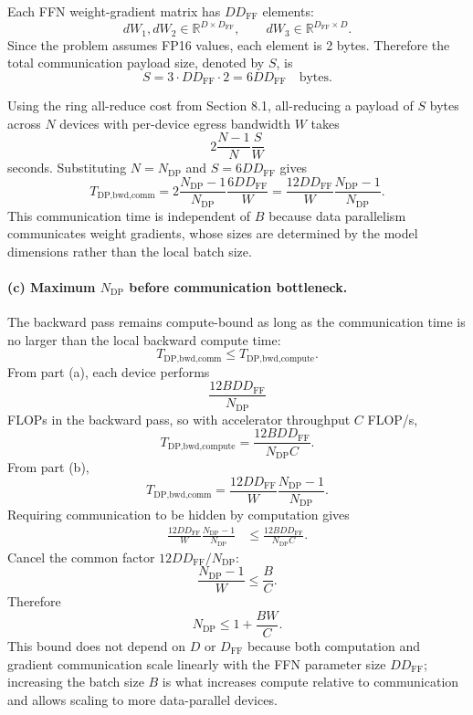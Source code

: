 \documentclass[11pt]{article}
\begin{document}
Each FFN weight-gradient matrix has $D D_{\text{FF}}$ elements:
\[
  dW_1, dW_2 \in \mathbb{R}^{D \times D_{\text{FF}}},
  \qquad
  dW_3 \in \mathbb{R}^{D_{\text{FF}} \times D}.
\]
Since the problem assumes FP16 values, each element is 2 bytes.  Therefore the
total communication payload size, denoted by $S$, is
\[
  S
  =
  3 \cdot D D_{\text{FF}} \cdot 2
  =
  6D D_{\text{FF}}
  \quad\text{bytes}.
\]

Using the ring all-reduce cost from Section 8.1, all-reducing a payload of
$S$ bytes across $N$ devices with per-device egress bandwidth $W$ takes
\[
  2\frac{N-1}{N}\frac{S}{W}
\]
seconds.  Substituting $N=N_{\text{DP}}$ and
$S=6D D_{\text{FF}}$ gives
\[
  \boxed{
  T_{\text{DP,bwd,comm}}
  =
  2\frac{N_{\text{DP}}-1}{N_{\text{DP}}}
  \frac{6D D_{\text{FF}}}{W}
  =
  \frac{12D D_{\text{FF}}}{W}
  \frac{N_{\text{DP}}-1}{N_{\text{DP}}}
  }.
\]
This communication time is independent of $B$ because data parallelism
communicates weight gradients, whose sizes are determined by the model
dimensions rather than the local batch size.


\paragraph{(c) Maximum $N_{\text{DP}}$ before communication bottleneck.}

The backward pass remains compute-bound as long as the communication time is no
larger than the local backward compute time:
\[
  T_{\text{DP,bwd,comm}}
  \le
  T_{\text{DP,bwd,compute}}.
\]
From part (a), each device performs
\[
  \frac{12 B D D_{\text{FF}}}{N_{\text{DP}}}
\]
FLOPs in the backward pass, so with accelerator throughput $C$ FLOP/s,
\[
  T_{\text{DP,bwd,compute}}
  =
  \frac{12 B D D_{\text{FF}}}{N_{\text{DP}} C}.
\]
From part (b),
\[
  T_{\text{DP,bwd,comm}}
  =
  \frac{12D D_{\text{FF}}}{W}
  \frac{N_{\text{DP}}-1}{N_{\text{DP}}}.
\]
Requiring communication to be hidden by computation gives
\begin{align*}
  \frac{12D D_{\text{FF}}}{W}
  \frac{N_{\text{DP}}-1}{N_{\text{DP}}}
  &\le
  \frac{12 B D D_{\text{FF}}}{N_{\text{DP}} C}.
\end{align*}
Cancel the common factor $12D D_{\text{FF}}/N_{\text{DP}}$:
\[
  \frac{N_{\text{DP}}-1}{W}
  \le
  \frac{B}{C}.
\]
Therefore
\[
  \boxed{
    N_{\text{DP}}
    \le
    1 + \frac{BW}{C}
  }.
\]
This bound does not depend on $D$ or $D_{\text{FF}}$ because both computation
and gradient communication scale linearly with the FFN parameter size
$D D_{\text{FF}}$; increasing the batch size $B$ is what increases compute
relative to communication and allows scaling to more data-parallel devices.
\end{document}
